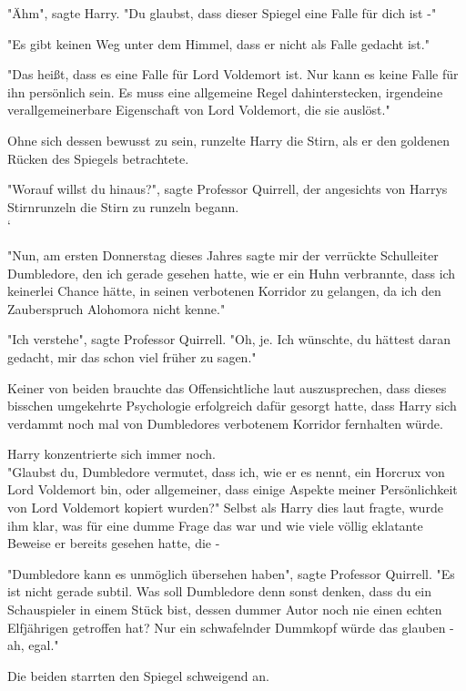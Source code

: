 {"Ähm", sagte Harry. "Du glaubst, dass dieser Spiegel eine Falle für dich ist -"

"Es gibt keinen Weg unter dem Himmel, dass er nicht als Falle gedacht ist."

"Das heißt, dass es eine Falle für Lord Voldemort ist. Nur kann es keine Falle für ihn persönlich sein. Es muss eine allgemeine Regel dahinterstecken, irgendeine verallgemeinerbare Eigenschaft von Lord Voldemort, die sie auslöst."

Ohne sich dessen bewusst zu sein, runzelte Harry die Stirn, als er den goldenen Rücken des Spiegels betrachtete.

"Worauf willst du hinaus?", sagte Professor Quirrell, der angesichts von Harrys Stirnrunzeln die Stirn zu runzeln begann.\\ `

"Nun, am ersten Donnerstag dieses Jahres sagte mir der verrückte Schulleiter Dumbledore, den ich gerade gesehen hatte, wie er ein Huhn verbrannte, dass ich keinerlei Chance hätte, in seinen verbotenen Korridor zu gelangen, da ich den Zauberspruch Alohomora nicht kenne."

"Ich verstehe", sagte Professor Quirrell. "Oh, je. Ich wünschte, du hättest daran gedacht, mir das schon viel früher zu sagen."

Keiner von beiden brauchte das Offensichtliche laut auszusprechen, dass dieses bisschen umgekehrte Psychologie erfolgreich dafür gesorgt hatte, dass Harry sich verdammt noch mal von Dumbledores verbotenem Korridor fernhalten würde.

Harry konzentrierte sich immer noch.\\ "Glaubst du, Dumbledore vermutet, dass ich, wie er es nennt, ein Horcrux von Lord Voldemort bin, oder allgemeiner, dass einige Aspekte meiner Persönlichkeit von Lord Voldemort kopiert wurden?" Selbst als Harry dies laut fragte, wurde ihm klar, was für eine dumme Frage das war und wie viele völlig eklatante Beweise er bereits gesehen hatte, die -

"Dumbledore kann es unmöglich übersehen haben", sagte Professor Quirrell. "Es ist nicht gerade subtil. Was soll Dumbledore denn sonst denken, dass du ein Schauspieler in einem Stück bist, dessen dummer Autor noch nie einen echten Elfjährigen getroffen hat? Nur ein schwafelnder Dummkopf würde das glauben - ah, egal."

Die beiden starrten den Spiegel schweigend an.

}
